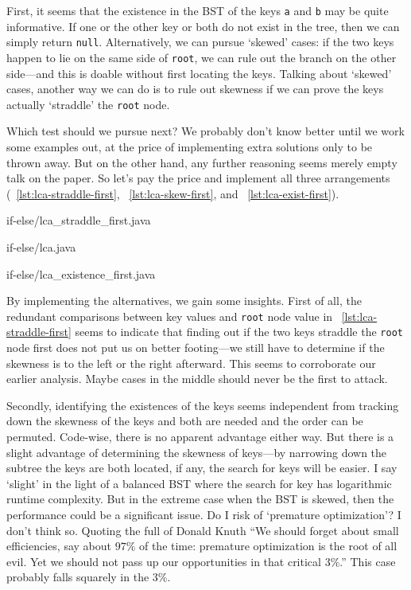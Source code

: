 \documentclass[oneside,11pt]{book}
\theoremstyle{definition}
\theoremstyle{remark}
\newcommand{\code}[1]{\mbox{\lstinline{#1}}}
\begin{document}
First, it seems that the existence in the BST of the keys \code{a} and \code{b} may be
quite informative.
If one or the other key or both do not exist in the tree, then we can simply return \code{null}.
Alternatively, we can pursue `skewed' cases: if the two keys happen to lie on the same side of
\code{root}, we can rule out the branch on the other side---and this is doable
without first locating the keys.
Talking about `skewed' cases, another way we can do is to rule out skewness if we can prove the keys
actually `straddle' the \code{root} node.


Which test should we pursue next?
We probably don't know better until we work some examples out, at the price of implementing extra
solutions only to be thrown away.
But on the other hand, any further reasoning seems merely empty talk on the paper.
So let's pay the price and implement all three arrangements (~\autoref{lst:lca-straddle-first},
~\ref{lst:lca-skew-first}, and ~\ref{lst:lca-exist-first}).
\begin{clisting}
    
    {if-else/lca_straddle_first.java}
    
    {if-else/lca.java}
    
    {if-else/lca_existence_first.java}
\end{clisting}

By implementing the alternatives, we gain some insights.
First of all, the redundant comparisons between key values and \code{root} node value in
~\autoref{lst:lca-straddle-first} seems to indicate that
finding out if the two keys straddle the \code{root} node first does not put us
on better footing---we still have to determine if the skewness is to the left or the right
afterward.
This seems to corroborate our earlier analysis.
Maybe cases in the middle should never be the first to attack.

Secondly, identifying the existences of the keys seems independent from tracking down the
skewness of the keys and both are needed and the order can be permuted.
Code-wise, there is no apparent advantage either way.
But there is a slight advantage of determining the skewness of keys---by narrowing down the
subtree the keys are both located, if any, the search for keys will be easier.
I say `slight' in the light of a balanced BST where the search for key has logarithmic runtime
complexity.
But in the extreme case when the BST is skewed, then the performance could be a significant issue.
Do I risk of `premature optimization'?
I don't think so.
Quoting the full of Donald Knuth ``We should forget about small efficiencies,
say about $97\%$ of the time: premature optimization is the root of all evil.
Yet we should not pass up our opportunities in that critical $3\%$.''
This case probably falls squarely in the $3\%$.
\end{document}
